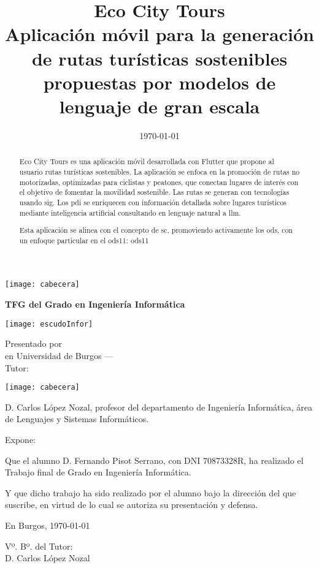 \documentclass[a4paper,12pt,twoside]{memoir}
\title{\fontsize{18pt}{22pt}\selectfont Eco City Tours\\
	\fontsize{16pt}{18pt}\selectfont Aplicación móvil para la generación de rutas turísticas sostenibles propuestas por modelos de lenguaje de gran escala}
\author{\nombre}
\date{\today}
\makeatletter
\def\maketitle{
  \null
  \thispagestyle{empty}
\noindent\texttt{[image: cabecera]}\vspace{1cm}%
  \vfill
  
  \colorbox{cpardoBox}{%
    \begin{minipage}{.8\textwidth}
      \vspace{.5cm}\Large
      \begin{center}
      \textbf{TFG del Grado en Ingeniería Informática}\vspace{.6cm}\\
      \textbf{\LARGE\@title{}}
      \end{center}
      \vspace{.2cm}
    \end{minipage}

  }%
  \hfill\begin{minipage}{.20\textwidth}
    \texttt{[image: escudoInfor]}
  \end{minipage}
  \vfill
  
  \begin{center}%
  {%
    \noindent\LARGE
    Presentado por \@author{}\\ 
    en Universidad de Burgos --- \@date{}\\
    Tutor: \@tutor{}\\
  }%
  \end{center}%
  \null
  \cleardoublepage
  }
\newcommand{\nombre}{Fernando Pisot Serrano}
\makeatother
\begin{document}
\maketitle




\thispagestyle{empty}


\noindent\texttt{[image: cabecera]}\vspace{1cm}

\noindent D. Carlos López Nozal, profesor del departamento de Ingeniería Informática, área de Lenguajes y Sistemas Informáticos.

\noindent Expone:

\noindent Que el alumno D. \nombre, con DNI 70873328R, ha realizado el Trabajo final de Grado en Ingeniería Informática. 

\noindent Y que dicho trabajo ha sido realizado por el alumno bajo la dirección del que suscribe, en virtud de lo cual se autoriza su presentación y defensa.

\begin{center} %
En Burgos, {\large \today}
\end{center}

\vfill\vfill\vfill

\begin{center}
  Vº. Bº. del Tutor:\\[2cm]
  D. Carlos López Nozal
  \end{center}


\newpage\null\thispagestyle{empty}\newpage




\frontmatter

\renewcommand*\abstractname{Resumen}
\begin{abstract}
Eco City Tours es una aplicación móvil desarrollada con Flutter que propone al usuario rutas turísticas sostenibles. La aplicación se enfoca en la promoción de rutas no motorizadas, optimizadas para ciclistas y peatones, que conectan lugares de interés con el objetivo de fomentar la movilidad sostenible. Las rutas se generan con tecnologías usando \acrfull{sig}. Los \acrfull{pdi} se enriquecen con información detallada sobre lugares turísticos mediante inteligencia artificial consultando en lenguaje natural a \acrfull{llm}.

Esta aplicación se alinea con el concepto de \acrshort{sc}, promoviendo activamente los \acrfull{ods}, con un enfoque particular en el \acrshort{ods11}: \acrlong{ods11}


\end{abstract}
\end{document}
